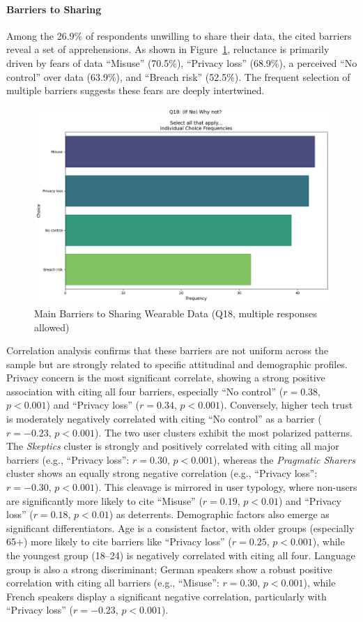 		\paragraph{Barriers to Sharing}
		Among the 26.9\% of respondents unwilling to share their data, the cited barriers reveal a set of apprehensions. As shown in Figure~\ref{fig:Q18_barriers}, reluctance is primarily driven by fears of data ``Misuse'' (70.5\%), ``Privacy loss'' (68.9\%), a perceived ``No control'' over data (63.9\%), and ``Breach risk'' (52.5\%). The frequent selection of multiple barriers suggests these fears are deeply intertwined.
		\begin{figure}[ht]\centering
			\includegraphics[width=0.7\linewidth]{figures/questions/Q18_multiple_choice.png}
			\caption{Main Barriers to Sharing Wearable Data (Q18, multiple responses allowed)}
			\label{fig:Q18_barriers}
		\end{figure}
		Correlation analysis confirms that these barriers are not uniform across the sample but are strongly related to specific attitudinal and demographic profiles. Privacy concern is the most significant correlate, showing a strong positive association with citing all four barriers, especially ``No control'' ($r = 0.38$, $p < 0.001$) and ``Privacy loss'' ($r = 0.34$, $p < 0.001$). Conversely, higher tech trust is moderately negatively correlated with citing ``No control'' as a barrier ($r = -0.23$, $p < 0.001$).
		The two user clusters exhibit the most polarized patterns. The \textit{Skeptics} cluster is strongly and positively correlated with citing all major barriers (e.g., ``Privacy loss'': $r = 0.30$, $p < 0.001$), whereas the \textit{Pragmatic Sharers} cluster shows an equally strong negative correlation (e.g., ``Privacy loss'': $r = -0.30$, $p < 0.001$). This cleavage is mirrored in user typology, where non-users are significantly more likely to cite ``Misuse'' ($r = 0.19$, $p < 0.01$) and ``Privacy loss'' ($r = 0.18$, $p < 0.01$) as deterrents.
		Demographic factors also emerge as significant differentiators. Age is a consistent factor, with older groups (especially 65+) more likely to cite barriers like ``Privacy loss'' ($r = 0.25$, $p < 0.001$), while the youngest group (18--24) is negatively correlated with citing all four. Language group is also a strong discriminant; German speakers show a robust positive correlation with citing all barriers (e.g., ``Misuse'': $r = 0.30$, $p < 0.001$), while French speakers display a significant negative correlation, particularly with ``Privacy loss'' ($r = -0.23$, $p < 0.001$).

